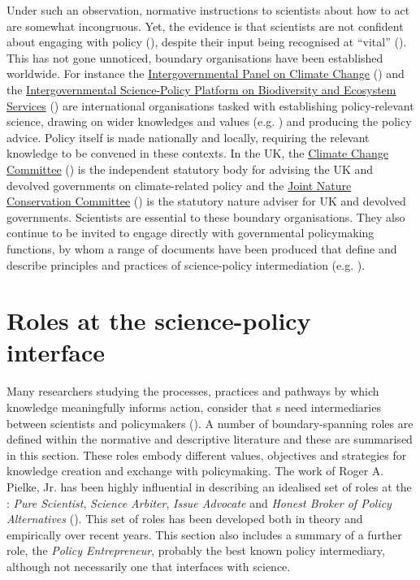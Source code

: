Under such an observation, normative instructions to scientists about how to act are somewhat incongruous. Yet, the evidence is that scientists are not confident about engaging with policy (\cite{KEU2021perceptions}), despite their input being recognised at ``vital'' (\cite{KennyRHTB2017}). This has not gone unnoticed, \SPI{} boundary organisations have been established worldwide. For instance the \href{https://www.ipcc.ch/}{Intergovernmental Panel on Climate Change} (\IPCC) and the \href{https://www.ipbes.net/}{Intergovernmental Science-Policy Platform on Biodiversity and Ecosystem Services} (\IPBES) are international organisations tasked with establishing policy-relevant science, drawing on wider knowledges and values (e.g. \cite{PascualEtAl2018,MatukBSAHT2020})  and producing the policy advice. Policy itself is made nationally and locally, requiring the relevant knowledge to be convened in these contexts. In the UK, the \href{https://www.theccc.org.uk/}{Climate Change Committee} (\CCC) is the independent statutory body for advising the UK and devolved governments on climate-related policy and the \href{https://jncc.gov.uk/}{Joint Nature Conservation Committee} (\JNCC) is the statutory nature adviser for UK and devolved governments. Scientists are essential to these boundary organisations. They also continue to be invited to engage directly with governmental policymaking functions, by whom a range of documents have been produced that define and describe principles and practices of science-policy intermediation (e.g. \cite{OECD2015,DottiACDMPSVW2024,KarkkainenLKK2024}). 

\section{Roles at the science-policy interface}\label{sec:litroles}

Many researchers studying the processes, practices and pathways by which knowledge meaningfully informs action, consider that \SPI s need intermediaries between scientists and policymakers (\cite{JagannathanEtAl2023}). A number of boundary-spanning roles are defined within the normative and descriptive literature and these are summarised in this section. These roles embody different values, objectives and strategies for knowledge creation and exchange with policymaking. The work of Roger A. Pielke, Jr. has been highly influential in describing an idealised set of roles at the \SPI: \emph{Pure Scientist}, \emph{Science Arbiter}, \emph{Issue Advocate} and \emph{Honest Broker of Policy Alternatives} (\cite{Pielke2007}). This set of roles has been developed both in theory and empirically over recent years. This section also includes a summary of a further role, the \emph{Policy Entrepreneur}, probably the best known policy intermediary, although not necessarily one that interfaces with science.


